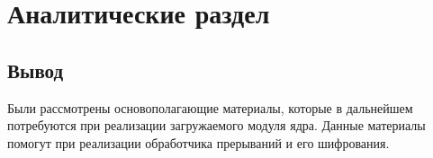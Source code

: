 \section{\large Аналитические раздел}


\subsection*{Вывод}

Были рассмотрены основополагающие материалы, которые в дальнейшем
потребуются при реализации загружаемого модуля ядра. 
Данные материалы помогут
при реализации обработчика прерываний и его шифрования.
